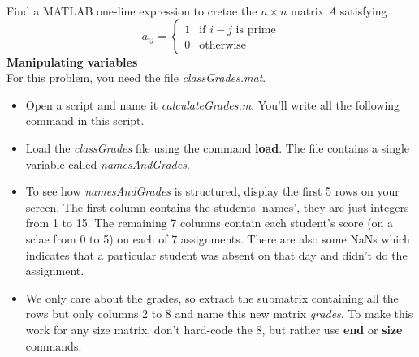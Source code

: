 \documentclass[12pt]{TDTP}
\begin{document}
\Exo
Find a MATLAB one-line expression to cretae the $n\times n$ matrix $A$ satisfying
$$
a_{ij} = 
\begin{cases}
   1 & \text{if } i-j \text{ is prime} \\
   0  & \text{otherwise}
 \end{cases}
$$
\Exo
\textbf{Manipulating variables}\\
For this problem, you need the file \emph{classGrades.mat}.
\begin{itemize}
\item Open a script and name it \emph{calculateGrades.m}. You'll write all the following command in this script.
\item Load the \emph{classGrades} file using the command \textbf{load}.
The file contains a single variable called \emph{namesAndGrades}.
\item To see how \emph{namesAndGrades} is structured, display the first 5 rows on your screen.
The first column contains the students 'names', they are just integers from 1 to 15.
The remaining 7 columns contain each student's score (on a sclae from 0 to 5) on each of 7 assignments.
There are also some NaNs which indicates that a particular student was absent on that day and didn't do the assignment.

\item We only care about the grades, so extract the submatrix containing all the rows but only columns 2 to 8 and name this new matrix \emph{grades}. To make this work for any size matrix, don't hard-code the 8, but rather use \textbf{end} or \textbf{size} commands. 
\end{itemize}
\end{document}

